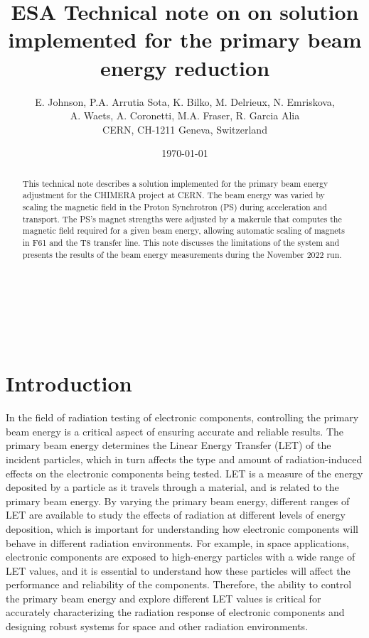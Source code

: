 \documentclass{cernatsnote}
\title{ESA Technical note on on solution implemented for the primary beam energy reduction}
\author{
	E. Johnson, P.A. Arrutia Sota, K. Bilko, M. Delrieux, N. Emriskova,\\ A. Waets, A. Coronetti,  M.A. Fraser, R. Garcia Alia\; \\		
	CERN, CH-1211 Geneva, Switzerland
}
\date{\today}
\begin{document}
\maketitle

\begin{abstract}
This technical note describes a solution implemented for the primary beam energy adjustment for the CHIMERA project at CERN. The beam energy was varied by scaling the magnetic field in the Proton Synchrotron (PS) during acceleration and transport. The PS's magnet strengths were adjusted by a makerule that computes the magnetic field required for a given beam energy, allowing automatic scaling of magnets in F61 and the T8 transfer line. This note discusses the limitations of the system and presents the results of the beam energy measurements during the November 2022 run.
\end{abstract}
\\ \\ \\ 

\begingroup
\color{black}
\tableofcontents
\endgroup

\pagebreak

\section{Introduction}
In the field of radiation testing of electronic components, controlling the primary beam energy is a critical aspect of ensuring accurate and reliable results. The primary beam energy determines the Linear Energy Transfer (LET) of the incident particles, which in turn affects the type and amount of radiation-induced effects on the electronic components being tested. LET is a measure of the energy deposited by a particle as it travels through a material, and is related to the primary beam energy. By varying the primary beam energy, different ranges of LET are available to study the effects of radiation at different levels of energy deposition, which is important for understanding how electronic components will behave in different radiation environments. For example, in space applications, electronic components are exposed to high-energy particles with a wide range of LET values, and it is essential to understand how these particles will affect the performance and reliability of the components. Therefore, the ability to control the primary beam energy and explore different LET values is critical for accurately characterizing the radiation response of electronic components and designing robust systems for space and other radiation environments.
\end{document}
